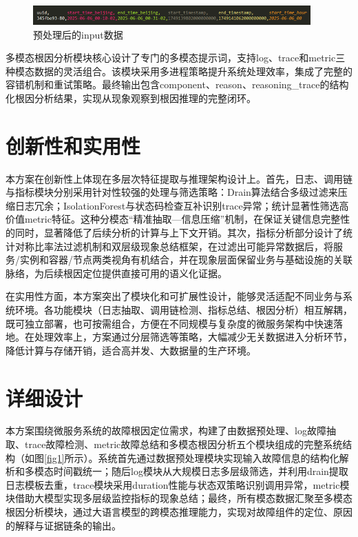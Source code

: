 \documentclass[11pt]{article}
\begin{document}
\begin{figure}[htbp]
    \centering
    \includegraphics[width=0.95\textwidth]{pics/fig3.png}
    \caption{预处理后的input数据}
    \label{fig3}
\end{figure}


多模态根因分析模块核心设计了专门的多模态提示词，支持log、trace和metric三种模态数据的灵活组合。该模块采用多进程策略提升系统处理效率，集成了完整的容错机制和重试策略。最终输出包含component、reason、reasoning\_trace的结构化根因分析结果，实现从现象观察到根因推理的完整闭环。


\section{创新性和实用性}
\label{sec:innovation}

本方案在创新性上体现在多层次特征提取与推理架构设计上。首先，日志、调用链与指标模块分别采用针对性较强的处理与筛选策略：Drain算法结合多级过滤来压缩日志冗余；IsolationForest与状态码检查互补识别trace异常；统计显著性筛选高价值metric特征。这种分模态“精准抽取—信息压缩”机制，在保证关键信息完整性的同时，显著降低了后续分析的计算与上下文开销。其次，指标分析部分设计了统计对称比率法过滤机制和双层级现象总结框架，在过滤出可能异常数据后，将服务/实例和容器/节点两类视角有机结合，并在现象层面保留业务与基础设施的关联脉络，为后续根因定位提供直接可用的语义化证据。

在实用性方面，本方案突出了模块化和可扩展性设计，能够灵活适配不同业务与系统环境。各功能模块（日志抽取、调用链检测、指标总结、根因分析）相互解耦，既可独立部署，也可按需组合，方便在不同规模与复杂度的微服务架构中快速落地。在处理效率上，方案通过分层筛选等策略，大幅减少无关数据进入分析环节，降低计算与存储开销，适合高并发、大数据量的生产环境。


\section{详细设计}
\label{sec:detail}

本方案围绕微服务系统的故障根因定位需求，构建了由数据预处理、log故障抽取、trace故障检测、metric故障总结和多模态根因分析五个模块组成的完整系统结构（如图\ref{fig1}所示）。系统首先通过数据预处理模块实现输入故障信息的结构化解析和多模态时间戳统一；随后log模块从大规模日志多层级筛选，并利用drain提取日志模板去重，trace模块采用duration性能与状态双策略识别调用异常，metric模块借助大模型实现多层级监控指标的现象总结；最终，所有模态数据汇聚至多模态根因分析模块，通过大语言模型的跨模态推理能力，实现对故障组件的定位、原因的解释与证据链条的输出。
\end{document}

